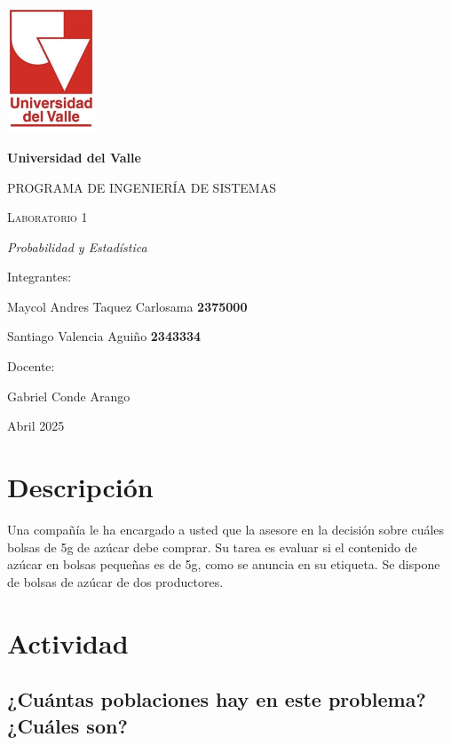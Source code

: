 \documentclass[12pt]{article}
\begin{document}
	\begin{titlepage}
		\centering
		{\includegraphics[width=0.2\textwidth]{img/Logo}\par}
		\vspace{1cm}
		{\bfseries\LARGE Universidad del Valle \par}
		\vspace{1cm}
		{\scshape\Large PROGRAMA DE INGENIERÍA DE SISTEMAS  \par}
		\vspace{1.5cm}
		{\scshape\Huge Laboratorio 1 \par}
		\vspace{1.5cm}
		{\itshape\Large Probabilidad y Estadística \par}
		\vfill
		{\Large Integrantes: \par}
		{\Large Maycol Andres Taquez Carlosama \textbf{2375000} \par}
		{\Large Santiago Valencia Aguiño \textbf{2343334} \par}
		\vfill
		{\Large Docente: \par}
		{\Large Gabriel Conde Arango \par}
		\vfill
		{\Large Abril 2025 \par}
	\end{titlepage} \newpage
	\section{Descripción}  
	Una compañía le ha encargado a usted que la asesore en la decisión sobre cuáles bolsas de 5g de azúcar debe 
	comprar. Su tarea es evaluar si el contenido de azúcar en bolsas pequeñas es de 5g, como se anuncia en su 
	etiqueta. Se dispone de bolsas de azúcar de dos productores. 
	
	\section{Actividad}
	
	\subsection{¿Cuántas poblaciones hay en este problema? ¿Cuáles son? }
	
\end{document}
